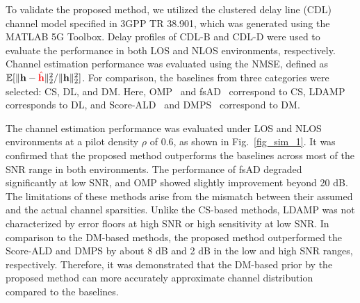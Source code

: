 \documentclass[lettersize,journal]{IEEEtran}
\newcommand{\tred}{\textcolor{red}}
\begin{document}
To validate the proposed method, we utilized the clustered delay line (CDL)
channel model specified in 3GPP TR 38.901, which was generated using the MATLAB 5G Toolbox. Delay profiles of CDL-B and CDL-D were used to evaluate the performance in both LOS and NLOS environments, respectively. Channel estimation performance was evaluated using the NMSE, defined as $\mathbb{E}[\|\mathbf{h}-\tred{\hat{\mathbf{h}}}\|_{2}^{2} / \|\mathbf{h}\|_{2}^{2}]$. For comparison, the baselines from three categories were selected: CS, DL, and DM. Here, OMP~\cite{zhangAtomicNormDenoisingBased2018} and  fsAD~\cite{mendez-rialHybridMIMOArchitectures2016} correspond to CS, LDAMP~\cite{heDeepLearningBasedChannel2018} corresponds to DL, and Score-ALD~\cite{arvinteMIMOChannelEstimation2023} and DMPS~\cite{zhouGenerativeDiffusionModels2025} correspond to DM.


The channel estimation performance was evaluated under LOS and NLOS environments at a pilot density $\rho$ of 0.6, as shown in Fig.~\ref{fig_sim_1}. It was confirmed that the proposed method outperforms the baselines across most of the SNR range in both environments. The performance of fsAD degraded significantly at low SNR, and OMP showed slightly improvement beyond 20 dB. The limitations of these methods arise from the mismatch between their assumed and the actual channel sparsities. Unlike the CS-based methods, LDAMP was not characterized by error floors at high SNR or high sensitivity at low SNR. In comparison to the DM-based methods, the proposed method outperformed the Score-ALD and DMPS by about 8 dB and 2 dB in the low and high SNR ranges, respectively. Therefore, it was demonstrated that the DM-based prior by the proposed method can more accurately approximate channel distribution compared to the baselines.
\end{document}

